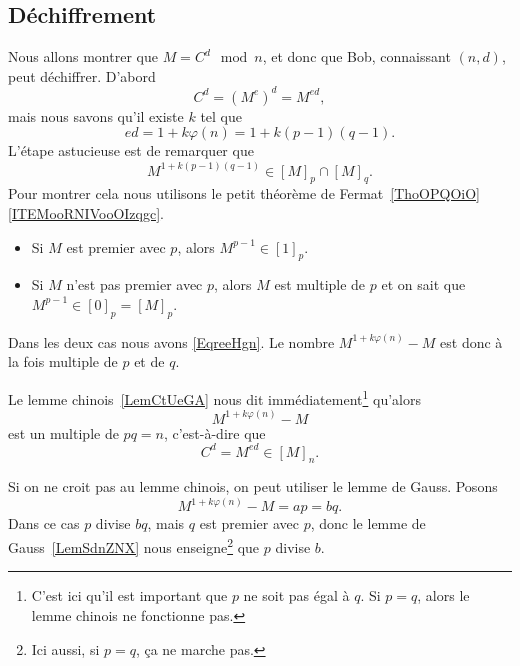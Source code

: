 \subsection{Déchiffrement}

Nous allons montrer que \( M=C^d\mod n\), et donc que Bob, connaissant \( (n,d)\), peut déchiffrer. D'abord
\begin{equation}
	C^d=(M^e)^d=M^{ed},
\end{equation}
mais nous savons qu'il existe \( k\) tel que
\begin{equation}
	ed=1+k\varphi(n)=1+k(p-1)(q-1).
\end{equation}
L'étape astucieuse est de remarquer que
\begin{equation}    \label{EqreeHgn}
	M^{1+k(p-1)(q-1)}\in [M]_p\cap[M]_q.
\end{equation}
Pour montrer cela nous utilisons le petit théorème de Fermat~\ref{ThoOPQOiO}\ref{ITEMooRNIVooOIzqgc}.
\begin{itemize}
	\item Si \( M\) est premier avec \( p\), alors \( M^{p-1}\in[1]_p\).
	\item Si \( M\) n'est pas premier avec \( p\), alors \( M\) est multiple de \( p\) et on sait que \( M^{p-1}\in[0]_p=[M]_p\).
\end{itemize}
Dans les deux cas nous avons \eqref{EqreeHgn}. Le nombre \( M^{1+k\varphi(n)}-M\) est donc à la fois multiple de \( p\) et de \( q\).

Le lemme chinois~\ref{LemCtUeGA} nous dit immédiatement\footnote{C'est ici qu'il est important que \( p\) ne soit pas égal à \( q\). Si \( p=q\), alors le lemme chinois ne fonctionne pas.} qu'alors
\begin{equation}
	M^{1+k\varphi(n)}-M
\end{equation}
est un multiple de \( pq=n\), c'est-à-dire que
\begin{equation}
	C^d=M^{ed}\in [M]_n.
\end{equation}

Si on ne croit pas au lemme chinois, on peut utiliser le lemme de Gauss. Posons
\begin{equation}
	M^{1+k\varphi(n)}-M=ap=bq.
\end{equation}
Dans ce cas \( p\) divise \( bq\), mais \( q\) est premier avec \( p\), donc le lemme de Gauss~\ref{LemSdnZNX} nous enseigne\footnote{Ici aussi, si \( p=q\), ça ne marche pas.} que \( p\) divise \( b\).

